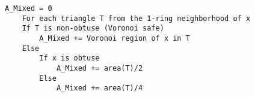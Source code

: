 \vspace{10pt}

\begin{lstlisting}[caption={Region $\mathcal{A}_{Mixed}$ on an arbitrary mesh. \cite{meshlab} (Section: \ref{section:localaveraging})\label{appendix:localaveraging}}]
    A_Mixed = 0
    For each triangle T from the 1-ring neighborhood of x
    If T is non-obtuse (Voronoi safe)
        A_Mixed += Voronoi region of x in T
    Else
        If x is obtuse
            A_Mixed += area(T)/2
        Else
            A_Mixed += area(T)/4
    \end{lstlisting}

